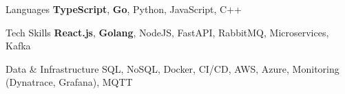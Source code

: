 
\begin{cvskills}

  \cvskill
  {Languages}
  {\textbf{TypeScript}, \textbf{Go}, Python, JavaScript, C++}

  \cvskill
  {Tech Skills}
  {\textbf{React.js}, \textbf{Golang}, NodeJS, FastAPI, RabbitMQ, Microservices, Kafka}

  \cvskill
  {Data \& Infrastructure}
  {SQL, NoSQL, Docker, CI/CD, AWS, Azure, Monitoring (Dynatrace, Grafana), MQTT}

\end{cvskills}
